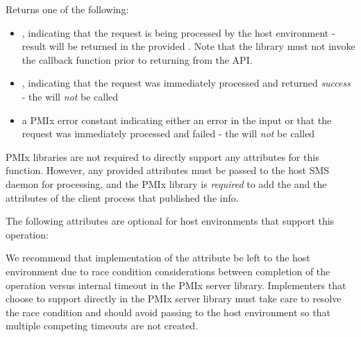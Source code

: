 \begin{arglist}
\end{arglist}

Returns one of the following:

\begin{itemize}
    \item {}, indicating that the request is being processed by the host environment - result will be returned in the provided . Note that the library must not invoke the callback function prior to returning from the \ac{API}.
    \item {}, indicating that the request was immediately processed and returned \textit{success} - the  will \textit{not} be called
    \item a PMIx error constant indicating either an error in the input or that the request was immediately processed and failed - the  will \textit{not} be called
\end{itemize}

\reqattrstart
\ac{PMIx} libraries are not required to directly support any attributes for this function. However, any provided attributes must be passed to the host \ac{SMS} daemon for processing, and the \ac{PMIx} library is \textit{required} to add the  and the  attributes of the client process that published the info.

\reqattrend

\optattrstart
The following attributes are optional for host environments that support this operation:


\optattrend

\adviceimplstart
We recommend that implementation of the  attribute be left to the host environment due to race condition considerations between completion of the operation versus internal timeout in the \ac{PMIx} server library. Implementers that choose to support  directly in the \ac{PMIx} server library must take care to resolve the race condition and should avoid passing  to the host environment so that multiple competing timeouts are not created.
\adviceimplend

